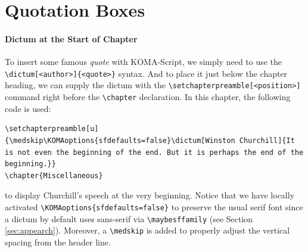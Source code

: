 \section{Quotation Boxes}

\paragraph{Dictum at the Start of Chapter}
To insert some famous \textit{quote} with KOMA-Script, we simply need to use the \texttt{\textbackslash dictum[<author>]\{<quote>\}} syntax. And to place it just below the chapter heading, we can supply the dictum with the \texttt{\textbackslash setchapterpreamble[<position>]} command right before the \texttt{\textbackslash chapter} declaration. In this chapter, the following code is used:
\begin{lstlisting}
\setchapterpreamble[u]{\medskip\KOMAoptions{sfdefaults=false}\dictum[Winston Churchill]{It is not even the beginning of the end. But it is perhaps the end of the beginning.}}
\chapter{Miscellaneous}
\end{lstlisting}
to display Churchill's speech at the very beginning. Notice that we have locally activated \texttt{\textbackslash KOMAoptions\{sfdefaults=false\}} to preserve the usual serif font since a dictum by default uses sans-serif via \texttt{\textbackslash maybesffamily} (see Section \ref{sec:appearch}). Moreover, a \texttt{\textbackslash medskip} is added to properly adjust the vertical spacing from the header line.

